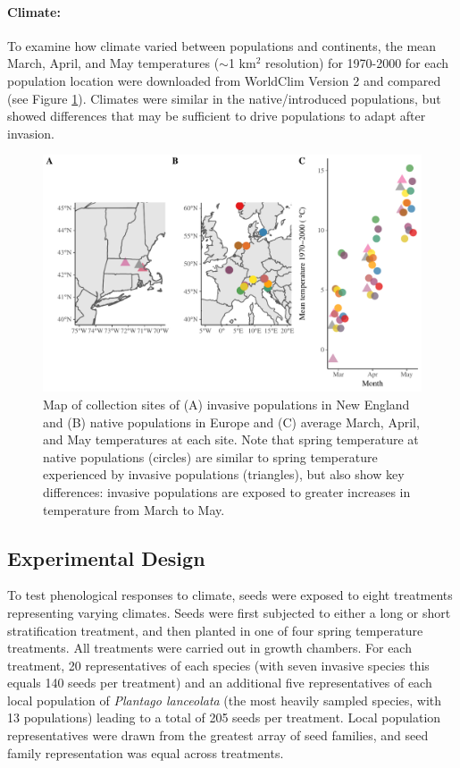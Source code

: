 \documentclass[11pt]{article}\usepackage[]{graphicx}\usepackage[]{color}
\begin{document}
	\paragraph{Climate:} 
	To examine how climate varied between populations and continents, the mean March, April, and May temperatures ($\sim$1 km$^2$ resolution) for 1970-2000 for each population location were downloaded from WorldClim Version 2 \parencite{Fick2017}  and compared (see Figure \ref{fig:sites}). Climates were similar in the native/introduced populations, but showed differences that may be sufficient to drive populations to adapt after invasion. 
	
	
	\begin{figure} 
		\centering
		\includegraphics[width=1 \textwidth,trim=0cm 0cm 0cm 0cm, angle=0, scale=.9, origin=c,clip=false]{sampling_sites}
		\caption{Map of collection sites of (A) invasive populations in New England and (B) native populations in Europe and (C) average March, April, and May temperatures at each site. Note that spring temperature at native populations (circles) are similar to spring temperature experienced by invasive populations (triangles), but also show key differences: invasive populations are exposed to greater increases in temperature from March to May. } %
		\label{fig:sites}
	\end{figure}


	\subsection{Experimental Design} 
	To test phenological responses to climate, seeds were exposed to eight treatments representing varying climates. Seeds were first subjected to either a long or short stratification treatment, and then planted in one of four spring temperature treatments. All treatments were carried out in growth chambers. For each treatment, 20 representatives of each species (with seven invasive species this equals 140 seeds per treatment) and an additional five representatives of each local population of \textit{Plantago lanceolata} (the most heavily sampled species, with 13 populations) leading to a total of 205 seeds per treatment. Local population representatives were drawn from the greatest array of seed families, and seed family representation was equal across treatments. 
	
\end{document}
